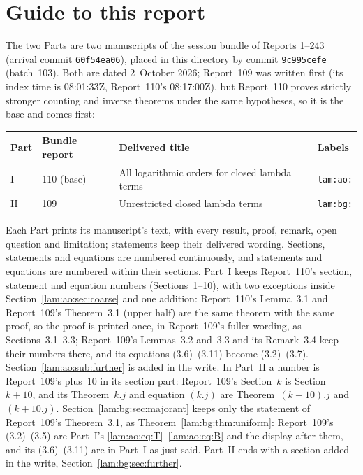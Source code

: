 \documentclass[11pt,a4paper]{article}
\numberwithin{equation}{section}
\theoremstyle{remark}
\begin{document}
\section*{Guide to this report}\label{lam:sec:guide}
The two Parts are two manuscripts of the session bundle of Reports 1--243 (arrival commit \texttt{60f54ea06}), placed in this directory by commit \texttt{9c995cefe} (batch~103). Both are dated 2~October 2026; Report~109 was written first (its index time is 08:01:33Z, Report~110's 08:17:00Z), but Report~110 proves strictly stronger counting and inverse theorems under the same hypotheses, so it is the base and comes first:
\begin{center}
\small
\begin{tabular}{@{}l l >{\raggedright\arraybackslash}p{} l@{}}
\toprule
Part & Bundle report & Delivered title & Labels\\
\midrule
I & 110 (base) & All logarithmic orders for closed lambda terms & \texttt{lam:ao:}\\
II & 109 & Unrestricted closed lambda terms & \texttt{lam:bg:}\\
\bottomrule
\end{tabular}
\end{center}
Each Part prints its manuscript's text, with every result, proof, remark, open question and limitation; statements keep their delivered wording. Sections, statements and equations are numbered continuously, and statements and equations are numbered within their sections. Part~I keeps Report~110's section, statement and equation numbers (Sections~1--10), with two exceptions inside Section~\ref{lam:ao:sec:coarse} and one addition: Report~110's Lemma~3.1 and Report~109's Theorem~3.1 (upper half) are the same theorem with the same proof, so the proof is printed once, in Report~109's fuller wording, as Sections~3.1--3.3; Report~109's Lemmas~3.2 and~3.3 and its Remark~3.4 keep their numbers there, and its equations (3.6)--(3.11) become (3.2)--(3.7). Section~\ref{lam:ao:sub:further} is added in the write. In Part~II a number is Report~109's plus~$10$ in its section part: Report~109's Section~$k$ is Section~$k+10$, and its Theorem~$k.j$ and equation $(k.j)$ are Theorem~$(k+10).j$ and $(k+10.j)$. Section~\ref{lam:bg:sec:majorant} keeps only the statement of Report~109's Theorem~3.1, as Theorem~\ref{lam:bg:thm:uniform}: Report~109's (3.2)--(3.5) are Part~I's \eqref{lam:ao:eq:T}--\eqref{lam:ao:eq:B} and the display after them, and its (3.6)--(3.11) are in Part~I as just said. Part~II ends with a section added in the write, Section~\ref{lam:bg:sec:further}.
\end{document}
